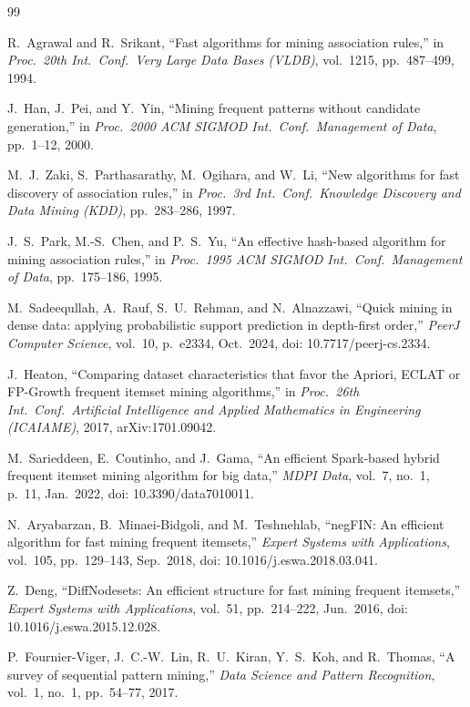 \documentclass[conference]{IEEEtran}
\begin{document}


\begin{thebibliography}{99}

R.\ Agrawal and R.\ Srikant,
``Fast algorithms for mining association rules,''
in \emph{Proc.\ 20th Int.\ Conf.\ Very Large Data Bases (VLDB)},
vol.\ 1215, pp.\ 487--499, 1994.

J.\ Han, J.\ Pei, and Y.\ Yin,
``Mining frequent patterns without candidate generation,''
in \emph{Proc.\ 2000 ACM SIGMOD Int.\ Conf.\ Management of Data},
pp.\ 1--12, 2000.

M.\ J.\ Zaki, S.\ Parthasarathy, M.\ Ogihara, and W.\ Li,
``New algorithms for fast discovery of association rules,''
in \emph{Proc.\ 3rd Int.\ Conf.\ Knowledge Discovery and Data Mining
(KDD)}, pp.\ 283--286, 1997.

J.\ S.\ Park, M.-S.\ Chen, and P.\ S.\ Yu,
``An effective hash-based algorithm for mining association rules,''
in \emph{Proc.\ 1995 ACM SIGMOD Int.\ Conf.\ Management of Data},
pp.\ 175--186, 1995.

M.\ Sadeequllah, A.\ Rauf, S.\ U.\ Rehman, and N.\ Alnazzawi,
``Quick mining in dense data: applying probabilistic support prediction
in depth-first order,''
\emph{PeerJ Computer Science}, vol.\ 10, p.\ e2334, Oct.\ 2024,
doi: 10.7717/peerj-cs.2334.

J.\ Heaton,
``Comparing dataset characteristics that favor the Apriori, ECLAT or
FP-Growth frequent itemset mining algorithms,''
in \emph{Proc.\ 26th Int.\ Conf.\ Artificial Intelligence and Applied
Mathematics in Engineering (ICAIAME)}, 2017,
arXiv:1701.09042.

M.\ Sarieddeen, E.\ Coutinho, and J.\ Gama,
``An efficient Spark-based hybrid frequent itemset mining algorithm
for big data,''
\emph{MDPI Data}, vol.\ 7, no.\ 1, p.\ 11, Jan.\ 2022,
doi: 10.3390/data7010011.

N.\ Aryabarzan, B.\ Minaei-Bidgoli, and M.\ Teshnehlab,
``negFIN: An efficient algorithm for fast mining frequent itemsets,''
\emph{Expert Systems with Applications}, vol.\ 105, pp.\ 129--143,
Sep.\ 2018, doi: 10.1016/j.eswa.2018.03.041.

Z.\ Deng,
``DiffNodesets: An efficient structure for fast mining frequent
itemsets,''
\emph{Expert Systems with Applications}, vol.\ 51, pp.\ 214--222,
Jun.\ 2016, doi: 10.1016/j.eswa.2015.12.028.

P.\ Fournier-Viger, J.\ C.-W.\ Lin, R.\ U.\ Kiran, Y.\ S.\ Koh,
and R.\ Thomas,
``A survey of sequential pattern mining,''
\emph{Data Science and Pattern Recognition}, vol.\ 1, no.\ 1,
pp.\ 54--77, 2017.

\end{thebibliography}
\end{document}
